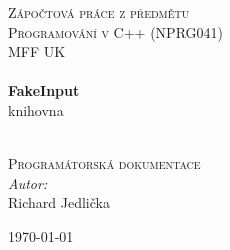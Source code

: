 \begin{titlepage}

\begin{center}

\textsc{\normalsize
    Zápočtová práce z předmětu\\
    Programování v C++ (NPRG041)\\
    MFF UK
}\\[1.5cm]


\HRule \\[0.4cm]
{\huge \bfseries FakeInput}\\
knihovna

\HRule \\[1.5cm]

\textsc{\Large Programátorská dokumentace}\\[2cm]

\emph{Autor:}\\
Richard Jedlička

\vfill

{\large \today}

\end{center}

\end{titlepage}
